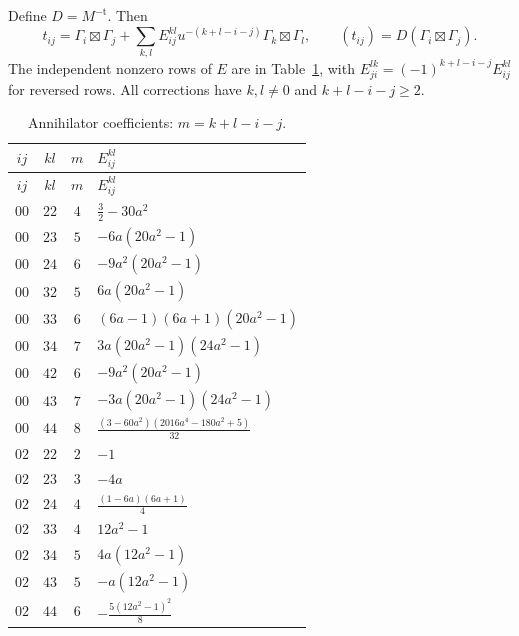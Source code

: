 Define $D=M^{-\mathrm t}$. Then
\begin{equation}\label{w4d:eq:dual-lattice}
 t_{ij}=\Gamma_i\boxtimes\Gamma_j+
       \sum_{k,l}E_{ij}^{kl}u^{-(k+l-i-j)}\Gamma_k\boxtimes\Gamma_l,
 \qquad (t_{ij})=D(\Gamma_i\boxtimes\Gamma_j).
\end{equation}
The independent nonzero rows of $E$ are in Table~\ref{w4d:tab:E}, with
$E_{ji}^{lk}=(-1)^{k+l-i-j}E_{ij}^{kl}$ for reversed rows. All corrections have $k,l\ne0$ and $k+l-i-j\geq2$.
\begingroup\small\renewcommand{\arraystretch}{1.24}
\begin{longtable}{@{}ccc>{\raggedright\arraybackslash}p{}@{}}
\caption{Annihilator coefficients: $m=k+l-i-j$.}\label{w4d:tab:E}\\
\toprule $ij$ & $kl$ & $m$ & $E_{ij}^{kl}$ \\ \midrule\endfirsthead
\toprule $ij$ & $kl$ & $m$ & $E_{ij}^{kl}$ \\ \midrule\endhead
\bottomrule\endfoot
$00$ & $22$ & $4$ & $\frac{3}{2} - 30 a^{2}$ \\
$00$ & $23$ & $5$ & $- 6 a \left(20 a^{2} - 1\right)$ \\
$00$ & $24$ & $6$ & $- 9 a^{2} \left(20 a^{2} - 1\right)$ \\
$00$ & $32$ & $5$ & $6 a \left(20 a^{2} - 1\right)$ \\
$00$ & $33$ & $6$ & $\left(6 a - 1\right) \left(6 a + 1\right) \left(20 a^{2} - 1\right)$ \\
$00$ & $34$ & $7$ & $3 a \left(20 a^{2} - 1\right) \left(24 a^{2} - 1\right)$ \\
$00$ & $42$ & $6$ & $- 9 a^{2} \left(20 a^{2} - 1\right)$ \\
$00$ & $43$ & $7$ & $- 3 a \left(20 a^{2} - 1\right) \left(24 a^{2} - 1\right)$ \\
$00$ & $44$ & $8$ & $\frac{\left(3 - 60 a^{2}\right) \left(2016 a^{4} - 180 a^{2} + 5\right)}{32}$ \\
$02$ & $22$ & $2$ & $-1$ \\
$02$ & $23$ & $3$ & $- 4 a$ \\
$02$ & $24$ & $4$ & $\frac{\left(1 - 6 a\right) \left(6 a + 1\right)}{4}$ \\
$02$ & $33$ & $4$ & $12 a^{2} - 1$ \\
$02$ & $34$ & $5$ & $4 a \left(12 a^{2} - 1\right)$ \\
$02$ & $43$ & $5$ & $- a \left(12 a^{2} - 1\right)$ \\
$02$ & $44$ & $6$ & $- \frac{5 \left(12 a^{2} - 1\right)^{2}}{8}$ \\

\end{longtable}
